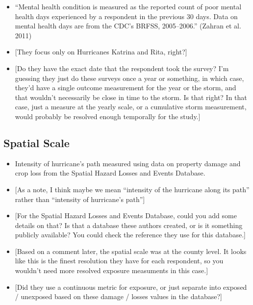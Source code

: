 \documentclass[
]{article}
\providecommand{\tightlist}{%
  \setlength{\itemsep}{0pt}\setlength{\parskip}{0pt}}
\begin{document}
\begin{itemize}
\tightlist
\item
  ``Mental health condition is measured as the reported count of poor
  mental health days experienced by a respondent in the previous 30
  days. Data on mental health days are from the CDC's BRFSS,
  2005--2006.'' (Zahran et al. 2011)
\item
  {[}They focus only on Hurricanes Katrina and Rita, right?{]}
\item
  {[}Do they have the exact date that the respondent took the survey?
  I'm guessing they just do these surveys once a year or something, in
  which case, they'd have a single outcome measurement for the year or
  the storm, and that wouldn't necessarily be close in time to the
  storm. Is that right? In that case, just a measure at the yearly
  scale, or a cumulative storm measurement, would probably be resolved
  enough temporally for the study.{]}
\end{itemize}

\hypertarget{spatial-scale-17}{%
\subsection{Spatial Scale}\label{spatial-scale-17}}

\begin{itemize}
\tightlist
\item
  Intensity of hurricane's path measured using data on property damage
  and crop loss from the Spatial Hazard Losses and Events Database.
\item
  {[}As a note, I think maybe we mean ``intensity of the hurricane along
  its path'' rather than ``intensity of hurricane's path''{]}
\item
  {[}For the Spatial Hazard Losses and Events Database, could you add
  some details on that? Is that a database these authors created, or is
  it something publicly available? You could check the reference they
  use for this database.{]}
\item
  {[}Based on a comment later, the spatial scale was at the county
  level. It looks like this is the finest resolution they have for each
  respondent, so you wouldn't need more resolved exposure measuments in
  this case.{]}
\item
  {[}Did they use a continuous metric for exposure, or just separate
  into exposed / unexposed based on these damage / losses values in the
  database?{]}
\end{itemize}
\end{document}

